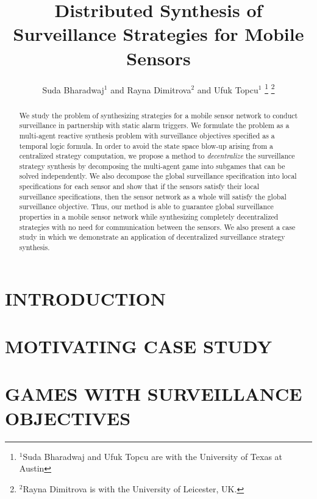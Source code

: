 \documentclass[letterpaper, 10 pt, conference]{ieeeconf}  %
\title{\LARGE \bf Distributed Synthesis of Surveillance Strategies for Mobile Sensors}
\author{Suda Bharadwaj$^{1}$ and Rayna Dimitrova$^{2}$ and Ufuk Topcu$^{1}$%
\thanks{$^{1}$Suda Bharadwaj and Ufuk Topcu are with the University of Texas at Austin}%
\thanks{$^{2}$Rayna Dimitrova is with the University of Leicester, UK.}%
}
\begin{document}
\maketitle
\thispagestyle{empty}
\pagestyle{empty}

\begin{abstract}
We study the problem of synthesizing strategies for a mobile sensor network to conduct surveillance in partnership with static alarm triggers. We formulate the problem as a multi-agent reactive synthesis problem with surveillance objectives specified as a temporal logic formula. In order to avoid the state space blow-up arising from a centralized strategy computation, we propose a method to \emph{decentralize} the surveillance strategy synthesis by decomposing the multi-agent game into subgames that can be solved independently. We also decompose the global surveillance specification into local specifications for each sensor and show that if the sensors satisfy their local surveillance specifications, then the sensor network as a whole will satisfy the global surveillance objective. Thus, our method is able to guarantee global surveillance properties in a mobile sensor network while synthesizing completely decentralized strategies with no need for communication between the sensors. We also present a case study in which we demonstrate an application of decentralized surveillance strategy synthesis.
\end{abstract}


\section{INTRODUCTION}


\section{MOTIVATING CASE STUDY}\label{sec:casestudy}


\section{GAMES WITH SURVEILLANCE OBJECTIVES}

\end{document}
